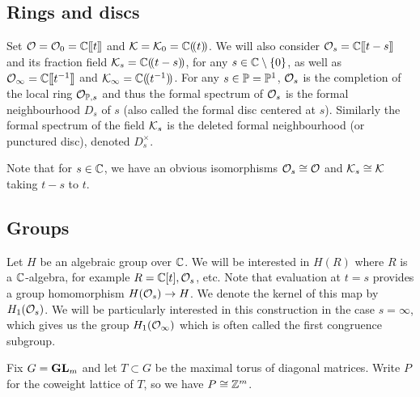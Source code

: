 \documentclass[draft]{article}
\begin{document}
\subsection{Rings and discs}

Set $\cO = \cO_0 = \CC\xt$ and $\cK = \cK_0 = \CC\xT$.
We will also consider $\cO_s = \CC\xt[t-s]$ and its fraction field $\cK_s=\CC\xT[t-s]$, for any 
$ s \in \CC\setminus\{0\} $, as well as $ \Oinf = \CC\xt[t^{-1}] $ and $\Kinf = \CC\xT[t^{-1}]$. For any $ s \in \PP = \PP^1$, 
$ \cO_s$ is the completion of the local ring $ \mathcal O_{\PP, s} $ and thus the formal spectrum of $ \cO_s$ is the formal neighbourhood $ D_s$ of $ s $ (also called the formal disc centered at $ s$).  Similarly the formal spectrum of the field $\cK_s$ is the deleted formal neighbourhood (or punctured disc), denoted $ D_s^\times$.

Note that for $ s \in \CC $, we have an obvious isomorphisms  $\cO_s \cong \cO$ and $\cK_s\cong\cK$ taking $ t-s $ to $ t$. 

\subsection{Groups}
Let $H $ be an algebraic group over $ \CC $.  We will be interested in $ H(R)$ where $ R $ is a $\CC$-algebra, for example $R = \CC[t], \cO_s$, etc.  
Note that evaluation at $ t = s$ provides a group homomorphism $ H(\cO_s) \rightarrow H$.  We denote the kernel of this map by $ H_1(\cO_s)$.  We will be particularly interested in this construction in the case $ s = \infty$, which gives us the group $ H_1(\Oinf)$ which is often called the first congruence subgroup.

Fix $G = \GL_m$ and let $T\subset G$ be the maximal torus of diagonal matrices. 
Write $P$ for the coweight lattice of $T$, so we have $P\cong \ZZ^m$.  
\end{document}
